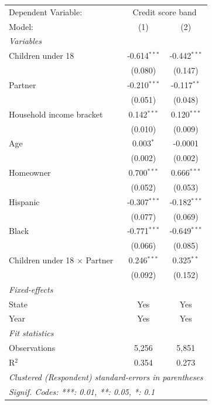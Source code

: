
\begingroup
\centering
\begin{tabular}{lcc}
   \tabularnewline \midrule \midrule
   Dependent Variable: & \multicolumn{2}{c}{Credit score band}\\
   Model:                              & (1)            & (2)\\  
   \midrule
   \emph{Variables}\\
   Children under 18                   & -0.614$^{***}$ & -0.442$^{***}$\\   
                                       & (0.080)        & (0.147)\\   
   Partner                             & -0.210$^{***}$ & -0.117$^{**}$\\   
                                       & (0.051)        & (0.048)\\   
   Household income bracket            & 0.142$^{***}$  & 0.120$^{***}$\\   
                                       & (0.010)        & (0.009)\\   
   Age                                 & 0.003$^{*}$    & -0.0001\\   
                                       & (0.002)        & (0.002)\\   
   Homeowner                           & 0.700$^{***}$  & 0.666$^{***}$\\   
                                       & (0.052)        & (0.053)\\   
   Hispanic                            & -0.307$^{***}$ & -0.182$^{***}$\\   
                                       & (0.077)        & (0.069)\\   
   Black                               & -0.771$^{***}$ & -0.649$^{***}$\\   
                                       & (0.066)        & (0.085)\\   
   Children under 18 $\times$ Partner  & 0.246$^{***}$  & 0.325$^{**}$\\   
                                       & (0.092)        & (0.152)\\   
   \midrule
   \emph{Fixed-effects}\\
   State                               & Yes            & Yes\\  
   Year                                & Yes            & Yes\\  
   \midrule
   \emph{Fit statistics}\\
   Observations                        & 5,256          & 5,851\\  
   R$^2$                               & 0.354          & 0.273\\  
   \midrule \midrule
   \multicolumn{3}{l}{\emph{Clustered (Respondent) standard-errors in parentheses}}\\
   \multicolumn{3}{l}{\emph{Signif. Codes: ***: 0.01, **: 0.05, *: 0.1}}\\
\end{tabular}
\par\endgroup



